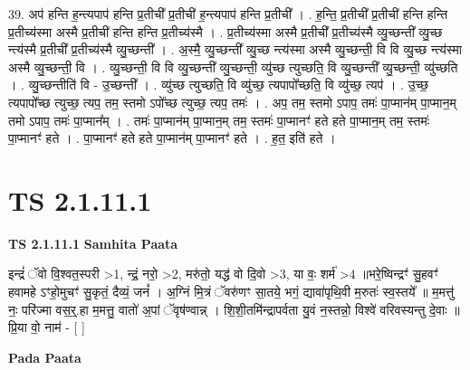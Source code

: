 \documentclass[17pt]{extarticle}
\begin{document}
39. अप॑ हन्ति ह॒न्त्यपाप॑ हन्ति प्र॒तीची᳚ प्र॒तीची॑ ह॒न्त्यपाप॑ हन्ति प्र॒तीची᳚ । . ह॒न्ति॒ प्र॒तीची᳚ प्र॒तीची॑ हन्ति हन्ति प्र॒तीच्य॑स्मा अस्मै प्र॒तीची॑ हन्ति हन्ति प्र॒तीच्य॑स्मै । . प्र॒तीच्य॑स्मा अस्मै प्र॒तीची᳚ प्र॒तीच्य॑स्मै व्यु॒च्छन्ती᳚ व्यु॒च्छ न्त्य॑स्मै प्र॒तीची᳚ प्र॒तीच्य॑स्मै व्यु॒च्छन्ती᳚ । . अ॒स्मै॒ व्यु॒च्छन्ती᳚ व्यु॒च्छ न्त्य॑स्मा अस्मै व्यु॒च्छन्ती॒ वि वि व्यु॒च्छ न्त्य॑स्मा अस्मै व्यु॒च्छन्ती॒ वि । . व्यु॒च्छन्ती॒ वि वि व्यु॒च्छन्ती᳚ व्यु॒च्छन्ती॒ व्यु॑च्छ त्युच्छति॒ वि व्यु॒च्छन्ती᳚ व्यु॒च्छन्ती॒ व्यु॑च्छति । . व्यु॒च्छन्तीति॑ वि - उ॒च्छन्ती᳚ । . व्यु॑च्छ त्युच्छति॒ वि व्यु॑च्छ॒ त्यपापो᳚च्छति॒ वि व्यु॑च्छ॒ त्यप॑ । . उ॒च्छ॒ त्यपापो᳚च्छ त्युच्छ॒ त्यप॒ तम॒ स्तमो ऽपो᳚च्छ त्युच्छ॒ त्यप॒ तमः॑ । . अप॒ तम॒ स्तमो ऽपाप॒ तमः॑ पा॒प्मान॑म् पा॒प्मान॒म् तमो ऽपाप॒ तमः॑ पा॒प्मान᳚म् । . तमः॑ पा॒प्मान॑म् पा॒प्मान॒म् तम॒ स्तमः॑ पा॒प्मानꣳ॑ हते हते पा॒प्मान॒म् तम॒ स्तमः॑ पा॒प्मानꣳ॑ हते । . पा॒प्मानꣳ॑ हते हते पा॒प्मान॑म् पा॒प्मानꣳ॑ हते । . ह॒त॒ इति॑ हते । \newline
\pagebreak
{}

\section{ TS 2.1.11.1 }

\textbf{TS 2.1.11.1 } \newline
\textbf{Samhita Paata} \newline

इन्द्रं॑ ॅवो वि॒श्वत॒स्परी >1, न्द्रं॒ नरो॒ >2, मरु॑तो॒ यद्ध॑ वो दि॒वो >3, या वः॒ शर्म॑ >4 ॥भरे॒ष्विन्द्रꣳ॑ सु॒हवꣳ॑ हवामहे ऽꣳहो॒मुचꣳ॑ सु॒कृतं॒ दैव्यं॒ जनं᳚ । अ॒ग्निं मि॒त्रं ॅवरु॑णꣳ सा॒तये॒ भगं॒ द्यावा॑पृथि॒वी म॒रुतः॑ स्व॒स्तये᳚ ॥ म॒मत्तु॑ नः॒ परि॑ज्मा वस॒र्॒.हा म॒मत्तु॒ वातो॑ अ॒पां ॅवृष॑ण्वान्न् । शि॒शी॒तमि॑न्द्रापर्वता यु॒वं न॒स्तन्नो॒ विश्वे॑ वरिवस्यन्तु दे॒वाः ॥ प्रि॒या वो॒ नाम॑ - [  ] \newline

\textbf{Pada Paata} \newline
\end{document}
